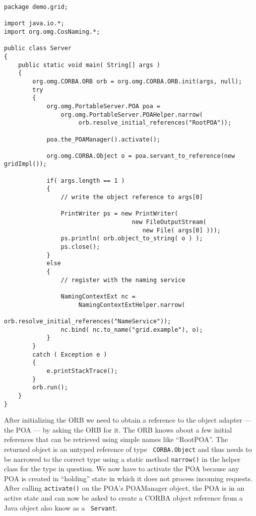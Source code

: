 \documentclass[12pt]{scrbook}
\begin{document}
\small{
\begin{verbatim}
package demo.grid;

import java.io.*;
import org.omg.CosNaming.*;

public class Server
{
    public static void main( String[] args )
    {
        org.omg.CORBA.ORB orb = org.omg.CORBA.ORB.init(args, null);
        try
        {
            org.omg.PortableServer.POA poa =
                org.omg.PortableServer.POAHelper.narrow(
                     orb.resolve_initial_references("RootPOA"));

            poa.the_POAManager().activate();

            org.omg.CORBA.Object o = poa.servant_to_reference(new gridImpl());

            if( args.length == 1 )
            {
                // write the object reference to args[0]

                PrintWriter ps = new PrintWriter(
                                    new FileOutputStream(
                                       new File( args[0] )));
                ps.println( orb.object_to_string( o ) );
                ps.close();
            }
            else
            {
                // register with the naming service

                NamingContextExt nc =
                     NamingContextExtHelper.narrow(
                        orb.resolve_initial_references("NameService"));
                nc.bind( nc.to_name("grid.example"), o);
            }
        }
        catch ( Exception e )
        {
            e.printStackTrace();
        }
        orb.run();
    }
}
\end{verbatim}
}

After initializing the ORB we need to obtain a reference to the object
adapter --- the POA --- by asking  the ORB for it. The ORB knows about
a few initial references that can be retrieved using simple names like
``RootPOA''. The returned object is  an untyped reference of type {\tt
CORBA.Object} and thus needs to  be narrowed to the correct type using
a static  method {\tt narrow()}  in the helper  class for the  type in
question. We now  have to activate the POA because  any POA is created
in  ``holding''   state  in  which   it  does  not   process  incoming
requests.  After  calling {\tt  activate()}  on  the POA's  POAManager
object, the POA is in an active state and can now be asked to create a
CORBA  object  reference  from a  Java  object  also  know as  a  {\tt
Servant}.
\end{document}
